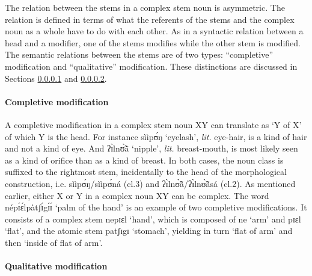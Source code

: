 \begin{exe}
\begin{exe}
\begin{exe}
\begin{exe}
\begin{exe}
\begin{exe}
\largerpage
The relation between the stems in a complex stem noun is asymmetric.  The relation is defined in terms of what the referents of the stems and the complex noun as a whole have to do with each other.  As in a syntactic relation between a head and a modifier, one of the stems modifies while the other stem is modified. The semantic relations between the stems  are of two types: ``completive'' modification and  ``qualitative'' modification. These distinctions are discussed in  Sections \ref{sec:GRM-comp-completive} and \ref{sec:GRM-comp-quality}.


\paragraph{Completive modification}
\label{sec:GRM-comp-completive}

A completive modification in a complex stem noun XY can translate as `Y of X' of which Y is the head. For instance {\sls sììpʊ́ŋ}   `eyelash', {\it lit.} eye-hair, is a kind of hair and not a kind of eye. And {\sls ʔɪ̀lnʊ̃̀ã̀} `nipple', {\it lit.} breast-mouth, is most likely seen as a kind of orifice than as  a kind of breast.  In both cases, the noun class is suffixed to the rightmost stem, incidentally to the head of the morphological construction, i.e. {\sls sììpʊ́ŋ}/{\sls sììpʊ́ná} {\sc (cl.3)} and {\sls ʔɪ̀lnʊ̃̀ã̀}/{\sls ʔɪ̀lnʊ̃̀ã̀sá} {\sc (cl.2)}. As mentioned earlier,  either X or Y  in a complex noun XY can be complex. The word {\sls népɪ́ɛ́lpàtʃɪ́gɪ́ɪ́} `palm of the hand' is an example of two completive modifications. It consists of a complex stem {\sls nepɪɛl} `hand', which is composed of  {\sls ne} `arm' and {\sls pɪɛl} `flat', and the atomic stem {\sls patʃɪgɪ} `stomach', yielding in turn  `flat of arm' and then `inside of flat of arm'. 


\paragraph{Qualitative modification}
\label{sec:GRM-comp-quality}


\end{exe}
\end{exe}
\end{exe}
\end{exe}
\end{exe}
\end{exe}
